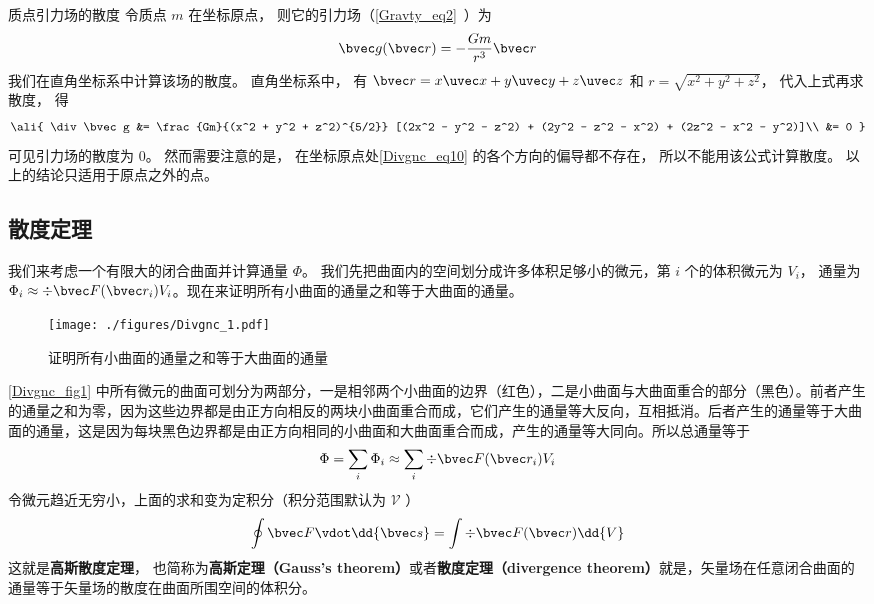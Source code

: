 \begin{example}{质点引力场的散度}
令质点 $m$ 在坐标原点， 则它的引力场（\autoref{Gravty_eq2}~）为
\begin{equation}\label{Divgnc_eq10}
\bvec g(\bvec r) = -\frac{Gm}{r^3}\bvec r
\end{equation}
我们在直角坐标系中计算该场的散度。 直角坐标系中， 有 $\bvec r = x\uvec x + y\uvec y + z\uvec z$ 和 $r = \sqrt{x^2 + y^2 + z^2}$， 代入上式再求散度， 得
\begin{equation}\ali{
\div \bvec g &= \frac{Gm}{(x^2 + y^2 + z^2)^{5/2}} [(2x^2 - y^2 - z^2) + (2y^2 - z^2 - x^2) + (2z^2 - x^2 - y^2)]\\
&= 0
}\end{equation}
可见引力场的散度为 0。 然而需要注意的是， 在坐标原点处\autoref{Divgnc_eq10} 的各个方向的偏导都不存在， 所以不能用该公式计算散度。 以上的结论只适用于原点之外的点。
\end{example}


\subsection{散度定理}

我们来考虑一个有限大的闭合曲面并计算通量 $\Phi$。 我们先把曲面内的空间划分成许多体积足够小的微元，第 $i$ 个的体积微元为 $V_i$， 通量为 $\Phi_i \approx \div \bvec F(\bvec r_i) V_i$。现在来证明所有小曲面的通量之和等于大曲面的通量。
\begin{figure}[ht]
\centering
\texttt{[image: ./figures/Divgnc\_1.pdf]}
\caption{证明所有小曲面的通量之和等于大曲面的通量} \label{Divgnc_fig1}
\end{figure}
\autoref{Divgnc_fig1} 中所有微元的曲面可划分为两部分，一是相邻两个小曲面的边界（红色），二是小曲面与大曲面重合的部分（黑色）。前者产生的通量之和为零，因为这些边界都是由正方向相反的两块小曲面重合而成，它们产生的通量等大反向，互相抵消。后者产生的通量等于大曲面的通量，这是因为每块黑色边界都是由正方向相同的小曲面和大曲面重合而成，产生的通量等大同向。所以总通量等于
\begin{equation}
\Phi  = \sum_i \Phi_i  \approx \sum_i \div \bvec F (\bvec r_i) V_i
\end{equation}
令微元趋近无穷小，上面的求和变为定积分（积分范围默认为 $\mathcal V$ ）
\begin{equation}\label{Divgnc_eq13}
\oint \bvec F \vdot \dd{\bvec s} = \int \div \bvec F(\bvec r) \dd{V}
\end{equation}
这就是\textbf{高斯散度定理}， 也简称为\textbf{高斯定理（Gauss's theorem）}或者\textbf{散度定理（divergence theorem）}就是，矢量场在任意闭合曲面的通量等于矢量场的散度在曲面所围空间的体积分。

